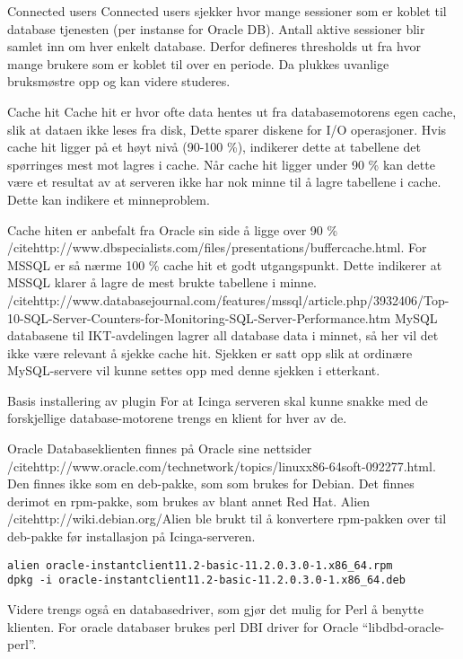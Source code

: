 Connected users
Connected users sjekker hvor mange sessioner som er koblet til database tjenesten (per instanse for Oracle DB). Antall aktive sessioner blir samlet inn om hver enkelt database. Derfor defineres thresholds ut fra hvor mange brukere som er koblet til over en periode. Da plukkes uvanlige bruksmøstre opp og kan videre studeres.

Cache hit
Cache hit er hvor ofte data hentes ut fra databasemotorens egen cache, slik at dataen ikke leses fra disk, Dette sparer diskene for I/O operasjoner. Hvis cache hit ligger på et høyt nivå (90-100 \%), indikerer dette at tabellene det spørringes mest mot lagres i cache. Når cache hit ligger under 90 \% kan dette være et resultat av at serveren ikke har nok minne til å lagre tabellene i cache. Dette kan indikere et minneproblem.

Cache hiten er anbefalt fra Oracle sin side å ligge over 90 \% /cite{http://www.dbspecialists.com/files/presentations/buffercache.html}. 
For MSSQL er så nærme 100 \% cache hit et godt utgangspunkt. Dette indikerer at MSSQL klarer å lagre de mest brukte tabellene i minne. /cite{http://www.databasejournal.com/features/mssql/article.php/3932406/Top-10-SQL-Server-Counters-for-Monitoring-SQL-Server-Performance.htm}
MySQL databasene til IKT-avdelingen lagrer all database data i minnet, så her vil det ikke være relevant å sjekke cache hit. Sjekken er satt opp slik at ordinære MySQL-servere vil kunne settes opp med denne sjekken i etterkant.

Basis installering av plugin 
For at Icinga serveren skal kunne snakke med de forskjellige database-motorene trengs en klient for hver av de. 

Oracle
Databaseklienten finnes på Oracle sine nettsider /cite{http://www.oracle.com/technetwork/topics/linuxx86-64soft-092277.html}. Den finnes ikke som en deb-pakke, som som brukes for Debian. Det finnes derimot en rpm-pakke, som brukes av blant annet Red Hat. Alien /cite{http://wiki.debian.org/Alien} ble brukt til å konvertere rpm-pakken over til deb-pakke før installasjon på Icinga-serveren. 
\begin{lstlisting}
alien oracle-instantclient11.2-basic-11.2.0.3.0-1.x86_64.rpm 
dpkg -i oracle-instantclient11.2-basic-11.2.0.3.0-1.x86_64.deb
\end{lstlisting}
Videre trengs også en databasedriver, som gjør det mulig for Perl å benytte klienten. For oracle databaser brukes perl DBI driver for Oracle “libdbd-oracle-perl”.

